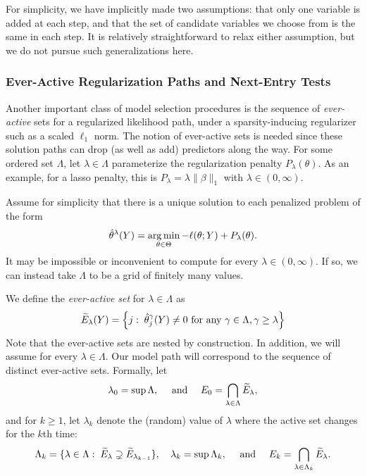 \documentclass{article}
\begin{document}
For simplicity, we have implicitly made two assumptions: that only one variable is added at each step, and that the set of candidate variables we choose from is the same in each step. It is relatively straightforward to relax either assumption, but we do not pursue such generalizations here.

\subsubsection{Ever-Active Regularization Paths and Next-Entry Tests}
Another important class of model selection procedures is the sequence of {\em ever-active} sets for a regularized likelihood path, under a sparsity-inducing regularizer such as a scaled $\ell_1$ norm. The notion of ever-active sets is needed since these solution paths can drop  (as well as add) predictors along the way. For some ordered set $\Lambda$, let $\lambda\in\Lambda$ parameterize the regularization penalty $P_\lambda(\theta)$. As an example, for a lasso penalty, this is $P_\lambda = \lambda\|\beta\|_1$ with $\lambda\in (0,\infty)$. 

Assume for simplicity that there is a unique solution to each penalized problem of the form
\begin{equation}\label{eq:pen-lik}
  \hat\theta^{\lambda}(Y) =
  \operatorname*{arg\,min}_{\theta\in\Theta} -\ell(\theta; Y) + P_\lambda(\theta).
\end{equation}
It may be impossible or inconvenient to compute  for every $\lambda\in(0,\infty)$. If so, we can instead take $\Lambda$ to be a grid of finitely many values. 

We define the {\em ever-active set} for $\lambda\in\Lambda$ as
\begin{equation}
  \widetilde{E}_\lambda(Y) = \left\{j:\; \hat\theta_j^\gamma(Y) \neq 0 
    \text{ for any } \gamma\in \Lambda, \gamma \geq \lambda \right\}
\end{equation}
Note that the ever-active sets \smash{$\tE_\lambda$} are nested by construction. In addition, we will assume \smash{$|\tE_\lambda|<\infty$} for every $\lambda\in\Lambda$. Our model path will correspond to the sequence of distinct ever-active sets. Formally, let 
\[
\lambda_0=\sup \Lambda, \quad \text{ and } \quad 
E_0 = \bigcap_{\lambda\in \Lambda} \widetilde{E}_\lambda,
\]
and for $k\geq 1$, let $\lambda_k$ denote the (random) value of $\lambda$ where the active set changes for the $k$th time:
\begin{equation*}
  \Lambda_k = \{\lambda\in \Lambda:\; \widetilde{E}_\lambda \supsetneq \widetilde{E}_{\lambda_{k-1}}\},
  \quad
  \lambda_k = \sup\Lambda_k,
  \quad \text{ and } \quad
  E_k = \bigcap_{\lambda\in\Lambda_k} \widetilde{E}_{\lambda}.
\end{equation*}
\end{document}
